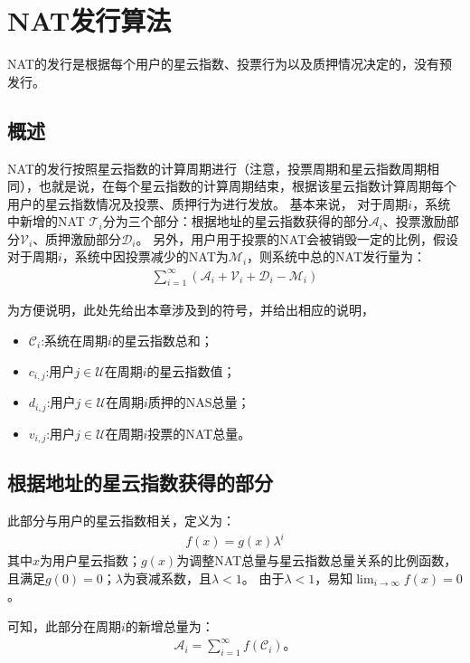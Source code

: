 
\section{NAT发行算法}

NAT的发行是根据每个用户的星云指数、投票行为以及质押情况决定的，没有预发行。

\subsection{概述}
NAT的发行按照星云指数的计算周期进行（注意，投票周期和星云指数周期相同），也就是说，在每个星云指数的计算周期结束，根据该星云指数计算周期每个用户的星云指数情况及投票、质押行为进行发放。
基本来说，
对于周期$i$，系统中新增的NAT $\mathcal{T}_i$分为三个部分：根据地址的星云指数获得的部分$\mathcal{A}_i$、投票激励部分$\mathcal{V}_i$、质押激励部分$\mathcal{D}_i$。
另外，用户用于投票的NAT会被销毁一定的比例，假设对于周期$i$，系统中因投票减少的NAT为$\mathcal{M}_i$，则系统中总的NAT发行量为：
\begin{align}
\sum_{i=1}^{\infty} (\mathcal{A}_i + \mathcal{V}_i + \mathcal{D}_i - \mathcal{M}_i)
\end{align}

为方便说明，此处先给出本章涉及到的符号，并给出相应的说明，
\begin{itemize}
\item $\mathcal{C}_i$:系统在周期$i$的星云指数总和；
\item $c_{i,j}$:用户$j \in \mathcal{U}$在周期$i$的星云指数值；
\item $d_{i,j}$:用户$j \in \mathcal{U}$在周期$i$质押的NAS总量；
\item $v_{i,j}$:用户$j \in \mathcal{U}$在周期$i$投票的NAT总量。
\end{itemize}

\subsection{根据地址的星云指数获得的部分}
此部分与用户的星云指数相关，定义为：
\begin{align}
    f(x) = g(x)\lambda^i
\end{align}
\noindent 其中$x$为用户星云指数；$g(x)$为调整NAT总量与星云指数总量关系的比例函数，且满足$g(0) = 0$；$\lambda$为衰减系数，且$\lambda < 1$。
由于$\lambda < 1$，易知$\lim_{i\to \infty}f(x) = 0$。

可知，此部分在周期$i$的新增总量为：
\begin{align}
\mathcal{A}_i = \sum_{i=1}^{\infty}f(\mathcal{C}_i)。
\end{align}

